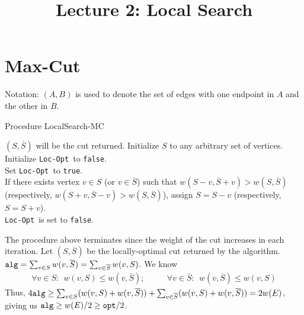 \documentclass[11pt]{article}
\def\eps{\varepsilon}
\def\bar{\overline}
\def\opt{{\tt opt}}
\def\alg{{\tt alg}}
\newlength{\algobox}
\begin{document}
\title{Lecture 2: Local Search}
\author{}
\date{}
\maketitle
\def\S{\bar{S}}
\def\loc{{\tt Loc-Opt }}
\def\true{{\tt true}}
\def\false{{\tt false}}


\section{Max-Cut}
Notation: $(A,B)$ is used to denote the set of edges with one endpoint in $A$ and the other in $B$.

\vspace{2ex}\noindent
\begin{boxedminipage}{\algobox}
Procedure {\sc LocalSearch-MC}
\begin{algorithmic}[1]
  \STATE $(S,\S)$ will be the cut returned. Initialize $S$ to any arbitrary set of vertices. \\
   Initialize \loc to  \false.\\
  \WHILE{\loc is \false}
  	\STATE Set \loc to \true. \\
  	\STATE If there exists vertex $v\in S$ (or $v\in \S$) such that $w(S-v,\S+v) > w(S,\S)$ (respectively, $w(S+v,\S-v) > w(S,\S)$), assign $S = S-v$ (respectively, $S = S+v$). \\
	            \loc is set to \false.\\
  \ENDWHILE
\end{algorithmic}
\end{boxedminipage}
\vspace{1ex}

The procedure above terminates since the weight of the cut increases in each iteration. 
Let $(S,\S)$ be the locally-optimal cut returned by the algorithm.
$\alg = \sum_{v\in S} w(v,\S) = \sum_{v\in \S} w(v,S)$.
We know
\begin{align*}
\forall v\in S: ~~  w(v,S)  \le  w(v,\S); ~~~~~~~~~~~~
\forall v\in \S: ~~  w(v,\S)  \le w(v,S) 
\end{align*}
Thus, $4\alg \ge \sum_{v\in S} (w(v,S) + w(v,\S)) + \sum_{v\in \S} (w(v,S) + w(v,\S)) = 2w(E)$,
giving us $\alg \ge w(E)/2 \ge \opt/2$.  \\
%
\end{document}
